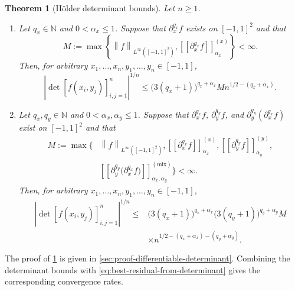 \documentclass[11pt]{article}
\newtheorem{theorem}{Theorem}[section]
\theoremstyle{definition}
\theoremstyle{remark}
\newcommand{\norm}[1]{\left\lVert #1\right\rVert}
\newcommand{\abs}[1]{\left\lvert #1\right\rvert}
\newcommand{\seminorm}[1]{\left[\!\left[ #1\right]\!\right]}
\begin{document}
\begin{theorem}[H\"older determinant bounds]
\label{thm:integer-determinant}
Let $n\ge1$.

\begin{enumerate}
\item
Let $q_x\in\mathbb N$ and $0<\alpha_x\le1$.
Suppose that $\partial_x^{q_x}f$ exists on $[-1,1]^2$ and that
\[
    M
    :=
    \max\left\{
      \norm{f}_{L^\infty([-1,1]^2)},
      \seminorm{\partial_x^{q_x}f}_{\alpha_x}^{(x)}
    \right\}
    <\infty.
\]
Then, for arbitrary
$x_1,\ldots,x_n,y_1,\ldots,y_n\in [-1, 1]$,
\begin{equation}
    \abs{\det[f(x_i,y_j)]_{i,j=1}^n}^{1/n}
    \le
    \bigl(3(q_x+1)\bigr)^{q_x+\alpha_x}
    M n^{1/2-(q_x+\alpha_x)}.
    \label{eq:one-sided-holder-determinant}
\end{equation}

\item
Let $q_x,q_y\in\mathbb N$ and
$0<\alpha_x,\alpha_y\le1$. Suppose that
$\partial_x^{q_x}f$, $\partial_y^{q_y}f$, and
$\partial_y^{q_y}(\partial_x^{q_x}f)$ exist on $[-1,1]^2$ and that
\[
\begin{aligned}
    M
    :=
    \max\biggl\{&
      \norm{f}_{L^\infty([-1,1]^2)},
      \seminorm{\partial_x^{q_x}f}_{\alpha_x}^{(x)},
      \seminorm{\partial_y^{q_y}f}_{\alpha_y}^{(y)},\\
      &\seminorm{
        \partial_y^{q_y}\bigl(\partial_x^{q_x}f\bigr)
      }_{\alpha_x,\alpha_y}^{(\mathrm{mix})}
    \biggr\}
    <\infty.
\end{aligned}
\]
Then, for arbitrary $x_1,\ldots,x_n,y_1,\ldots,y_n\in [-1, 1]$,
\begin{equation}
\begin{aligned}
    \abs{\det[f(x_i,y_j)]_{i,j=1}^n}^{1/n}
    \le{}&
    \bigl(3(q_x+1)\bigr)^{q_x+\alpha_x}
    \bigl(3(q_y+1)\bigr)^{q_y+\alpha_y}
    M\\
    &\times
    n^{1/2-(q_x+\alpha_x)-(q_y+\alpha_y)}.
    \label{eq:integer-determinant}
\end{aligned}
\end{equation}
\end{enumerate}
\end{theorem}

The proof of \cref{thm:integer-determinant} is given in
\cref{sec:proof-differentiable-determinant}. Combining the determinant
bounds with \eqref{eq:best-residual-from-determinant} gives the
corresponding convergence rates.
\end{document}
